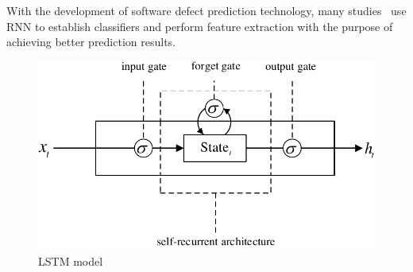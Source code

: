 \documentclass[journal]{IEEEtran}
\begin{document}
With the development of software defect prediction technology, many studies~\cite{fan2019deep,liang2019seml,liu2018connecting} use RNN to establish classifiers and perform feature extraction with the purpose of achieving better prediction results.
\begin{figure}[htbp]
	\centering
	\includegraphics[scale=0.65]{figs/LSTM_model.pdf}
	\caption{LSTM model}
	\label{fig2}
\end{figure}
\end{document}
